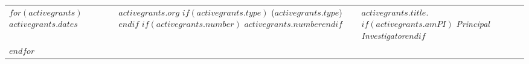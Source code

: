 \documentclass[martgin, line, 10pt]{article}
\begin{document}
\setlength{\extrarowheight}{.5em}
\begin{longtable}[l]{lp{2.5in}p{4.5in}}
  $for(activegrants)$
  $activegrants.dates$&
  \parbox[t]{2.25in} {
  $activegrants.org$
  $if(activegrants.type)$
  ($activegrants.type$)
  $endif$
  $if(activegrants.number)$\\$activegrants.number$$endif$}&
  \parbox[t]{3in}{$activegrants.title$.
  $if(activegrants.amPI)$ \textit{Principal Investigator}$endif$}\\
  $endfor$
  
\end{longtable}
\setlength{\extrarowheight}{.0em}
\end{document}
